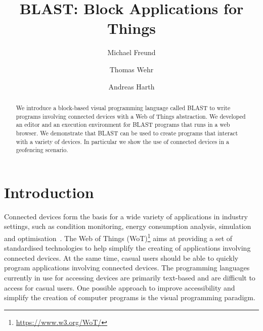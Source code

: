 \documentclass[runningheads]{llncs}
\begin{document}
%
\title{BLAST: Block Applications for Things}
%
%
\author{Michael Freund \and
Thomas Wehr \and
Andreas Harth}
%
%
%
\maketitle              %
%
\begin{abstract}
  We introduce a block-based visual programming language called BLAST to write programs involving connected devices with a Web of Things abstraction.
  We developed an editor and an execution environment for BLAST programs that runs in a web browser.
  We demonstrate that BLAST can be used to create programs that interact with a variety of devices.
  In particular we show the use of connected devices in a geofencing scenario.
\end{abstract}
%
%
%
\setcounter{footnote}{0}
\section{Introduction}
Connected devices form the basis for a wide variety of applications in industry settings, such as condition monitoring, energy consumption analysis, simulation and optimisation~\cite{CIMINO2019103130}.
The Web of Things (WoT)\footnote{\url{https://www.w3.org/WoT/}} aims at providing a set of standardised technologies to help simplify the creating of applications involving connected devices.
At the same time, casual users should be able to quickly program applications involving connected devices.
The programming languages currently in use for accessing devices are primarily text-based and are difficult to access for casual users.
One possible approach to improve accessibility and simplify the creation of computer programs is the visual programming paradigm.
\end{document}
